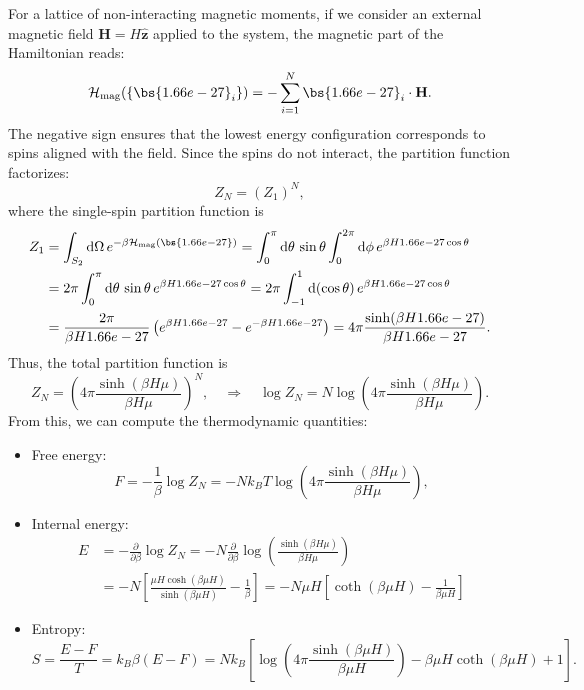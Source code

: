 For a lattice of non-interacting magnetic moments, if we consider an external magnetic field
$\mathbf{H} = H \hat{\mathbf{z}}$ applied to the system, the magnetic part of the Hamiltonian reads:
\begin{equation}
    \mathcal{H}_{\mathrm{mag}}(\{\bs{\mu}_i\}) = - \sum_{i=1}^N \bs{\mu}_i \cdot \mathbf{H}.
    \label{eq:Heisenberg_magnetic_hamiltonian}
\end{equation}
The negative sign ensures that the lowest energy configuration corresponds to spins aligned with the field.
Since the spins do not interact, the partition function factorizes:
\[
    Z_N = (Z_1)^N,
\]
where the single-spin partition function is
\[
    \begin{aligned}
        Z_1 & = \int_{S_2} \mathrm{d}\Omega \, e^{-\beta \mathcal{H}_{\mathrm{mag}}(\bs{\mu})}
        = \int_0^\pi \mathrm{d}\theta \, \sin\theta \int_0^{2\pi} \mathrm{d}\phi \, e^{\beta H \mu \cos\theta} \\
            & = 2\pi \int_0^\pi \mathrm{d}\theta \, \sin\theta \, e^{\beta H \mu \cos\theta}
        = 2\pi \int_{-1}^{1} \mathrm{d}(\cos\theta) \, e^{\beta H \mu \cos\theta}                              \\
            & = \frac{2\pi}{\beta H \mu} \left( e^{\beta H \mu} - e^{-\beta H \mu} \right)
        = 4\pi \frac{\sinh(\beta H \mu)}{\beta H \mu}.
    \end{aligned}
\]
Thus, the total partition function is
\begin{equation}
    Z_N = \left( 4\pi \frac{\sinh(\beta H \mu)}{\beta H \mu} \right)^N,
    \quad \Rightarrow \quad
    \log Z_N = N \log\left( 4\pi \frac{\sinh(\beta H \mu)}{\beta H \mu} \right).
    \label{eq:Heisenberg_partition_potential}
\end{equation}
From this, we can compute the thermodynamic quantities:
\begin{itemize}
    \item Free energy:
          \[
              F = - \frac{1}{\beta} \log Z_N = - N k_B T \log\left( 4\pi \frac{\sinh(\beta H \mu)}{\beta H \mu} \right),
          \]

    \item Internal energy:
          \[
              \begin{aligned}
                  E & = - \frac{\partial}{\partial \beta} \log Z_N
                  = - N \frac{\partial}{\partial \beta} \log\left( \frac{\sinh(\beta H \mu)}{\beta H \mu} \right) \\
                    & = - N \left[ \frac{\mu H \cosh(\beta \mu H)}{\sinh(\beta \mu H)} - \frac{1}{\beta} \right]
                  = - N \mu H \left[ \coth(\beta \mu H) - \frac{1}{\beta \mu H} \right]
              \end{aligned}
          \]

    \item Entropy:
          \[
              S = \frac{E-F}{T} = k_B \beta (E-F) = Nk_B \left[ \log\left( 4\pi \frac{\sinh(\beta \mu H)}{\beta \mu H} \right) - \beta \mu H \coth(\beta \mu H) + 1 \right].
          \]
\end{itemize}

